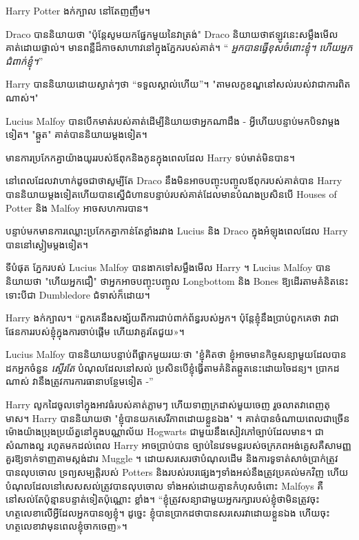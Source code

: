 {{Harry Potter ងក់ក្បាល នៅតែញញឹម។

Draco បាន​និយាយ​ថា "ប៉ុន្តែ​សូម​យក​ផ្នែក​មួយ​នៃ​វា​ត្រង់" Draco និយាយ​ថា​ឥឡូវ​នេះ​សម្លឹង​មើល​គាត់​ដោយ​ផ្ទាល់​។ មានពន្លឺដ៏កាចសាហាវនៅក្នុងភ្នែករបស់គាត់។ “\emph{ អ្នកបានធ្វើខុសចំពោះខ្ញុំ។ \emph{ហើយ}អ្នកជំពាក់ខ្ញុំ។}”

Harry បាននិយាយដោយស្ងាត់ៗថា “ទទួលស្គាល់ហើយ”។ "តាម​លក្ខខណ្ឌ​នៅ​សល់​របស់​វា​ជា​ការ​ពិត​ណាស់​។"

Lucius Malfoy បានបើកមាត់របស់គាត់ដើម្បីនិយាយថាអ្នកណាដឹង - អ្វីហើយបន្ទាប់មកបិទវាម្តងទៀត។ "ឆ្កួត" គាត់បាននិយាយម្តងទៀត។

មាន​ការ​ប្រកែក​គ្នា​យ៉ាង​យូរ​របស់​ឪពុក​និង​កូន​ក្នុង​ពេល​ដែល Harry ទប់​មាត់​មិន​បាន។

នៅពេលដែលវាហាក់ដូចជាថាសូម្បីតែ Draco នឹងមិនអាចបញ្ចុះបញ្ចូលឪពុករបស់គាត់បាន Harry បាននិយាយម្តងទៀតហើយបានស្នើជំហានបន្ទាប់របស់គាត់ដែលមានបំណងប្រសិនបើ Houses of Potter និង Malfoy អាចសហការបាន។

បន្ទាប់មកមានការឈ្លោះប្រកែកគ្នាកាន់តែខ្លាំងរវាង Lucius និង Draco ក្នុងអំឡុងពេលដែល Harry បាននៅស្ងៀមម្តងទៀត។

ទីបំផុត ភ្នែករបស់ Lucius Malfoy បានងាកទៅសម្លឹងមើល Harry ។ Lucius Malfoy បាននិយាយថា "ហើយអ្នកជឿ" ថាអ្នកអាចបញ្ចុះបញ្ចូល Longbottom និង Bones ឱ្យដើរតាមគំនិតនេះ ទោះបីជា Dumbledore ជំទាស់ក៏ដោយ។

Harry ងក់ក្បាល។ “ពួកគេ​នឹង​សង្ស័យ​ពី​ការ​ជាប់​ពាក់ព័ន្ធ​របស់​អ្នក។ ប៉ុន្តែ​ខ្ញុំ​នឹង​ប្រាប់​ពួកគេ​ថា វា​ជា​ផែនការ​របស់​ខ្ញុំ​ក្នុង​ការ​ចាប់​ផ្ដើម ហើយ​វា​គួរ​តែ​ជួយ»។

Lucius Malfoy បាន​និយាយ​បន្ទាប់​ពី​ផ្អាក​មួយ​រយៈ​ថា "ខ្ញុំ​គិត​ថា ខ្ញុំ​អាច​មាន​កិច្ច​សន្យា​មួយ​ដែល​បាន​ដក​អ្នក​ចំនួន \emph{ស្ទើរ​តែ} បំណុល​ដែល​នៅ​សល់ ប្រសិន​បើ​ខ្ញុំ​ធ្វើ​តាម​គំនិត​ឆ្កួត​នេះ​ដោយ​ចៃដន្យ។ ប្រាកដណាស់ វានឹងត្រូវការការធានាបន្ថែមទៀត -”

Harry លូកដៃចូលទៅក្នុងអាវធំរបស់គាត់ភ្លាមៗ ហើយទាញក្រដាស់មួយចេញ រួចលាតវាពេញតុមាស។ Harry បាននិយាយថា "ខ្ញុំបានយកសេរីភាពដោយខ្លួនឯង" ។ គាត់បានចំណាយពេលជាច្រើនម៉ោងយ៉ាងប្រុងប្រយ័ត្ននៅក្នុងបណ្ណាល័យ Hogwarts ជាមួយនឹងសៀវភៅច្បាប់ដែលមាន។ ជាសំណាងល្អ រហូតមកដល់ពេល Harry អាចប្រាប់បាន ច្បាប់នៃវេទមន្តរបស់ចក្រភពអង់គ្លេសគឺសាមញ្ញគួរឱ្យទាក់ទាញតាមស្តង់ដារ Muggle ។ ដោយសរសេរថាបំណុលដើម និងការទូទាត់សាច់ប្រាក់ត្រូវបានលុបចោល ទ្រព្យសម្បត្តិរបស់ Potters និងរបស់របរផ្សេងៗទាំងអស់នឹងត្រូវប្រគល់មកវិញ ហើយបំណុលដែលនៅសេសសល់ត្រូវបានលុបចោល ទាំងអស់ដោយគ្មានកំហុសចំពោះ Malfoys គឺនៅសល់តែប៉ុន្មានបន្ទាត់ទៀតប៉ុណ្ណោះ ខ្លាំង។ “ខ្ញុំ​ត្រូវ​សន្យា​ជាមួយ​អ្នក​រក្សា​របស់​ខ្ញុំ​ថា​មិន​ត្រូវ​ចុះហត្ថលេខា​លើ​អ្វី​ដែល​អ្នក​បាន​ឲ្យ​ខ្ញុំ។ ដូច្នេះ ខ្ញុំ​បាន​ប្រាកដ​ថា​បាន​សរសេរ​វា​ដោយ​ខ្លួន​ឯង ហើយ​ចុះហត្ថលេខា​វា​មុន​ពេល​ខ្ញុំ​ចាកចេញ»។

}}
